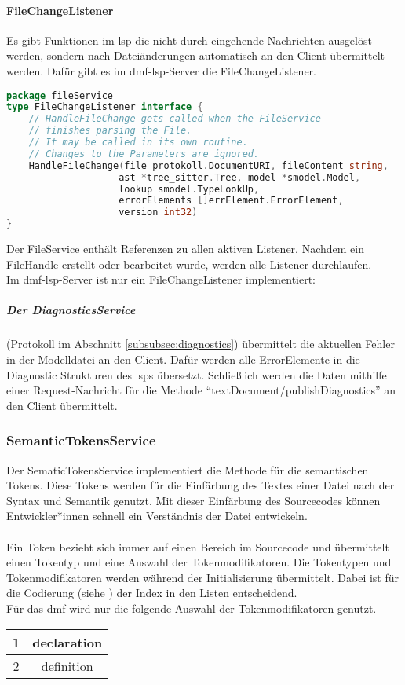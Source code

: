\documentclass[./einleitung.tex]{subfiles}
\begin{document}
    \paragraph{FileChangeListener}
    Es gibt Funktionen im \acrshort{lsp} die nicht durch eingehende Nachrichten ausgelöst werden, sondern nach Dateiänderungen automatisch an den Client übermittelt werden.
    Dafür gibt es im \acrshort{dmf}-\acrshort{lsp}-Server die FileChangeListener.
    \begin{lstlisting}[language=Go]
package fileService
type FileChangeListener interface {
	// HandleFileChange gets called when the FileService
    // finishes parsing the File.
    // It may be called in its own routine.
    // Changes to the Parameters are ignored.
	HandleFileChange(file protokoll.DocumentURI, fileContent string,
                    ast *tree_sitter.Tree, model *smodel.Model,
                    lookup smodel.TypeLookUp,
                    errorElements []errElement.ErrorElement,
                    version int32)
}
    \end{lstlisting}
    Der FileService enthält Referenzen zu allen aktiven Listener.
    Nachdem ein FileHandle erstellt oder bearbeitet wurde, werden alle Listener durchlaufen.\\
    Im \acrshort{dmf}-\acrshort{lsp}-Server ist nur ein FileChangeListener implementiert:
    \subparagraph[DiagnosticsService]{Der DiagnosticsService }\label{subsubsec:diagnostics-service}
    (Protokoll im Abschnitt \ref{subsubsec:diagnostics})
    übermittelt die aktuellen Fehler in der Modelldatei an den Client.
    Dafür werden alle ErrorElemente in die Diagnostic Strukturen des \acrshort{lsp}s übersetzt.
    Schließlich werden die Daten mithilfe einer Request-Nachricht für die Methode ``textDocument/publishDiagnostics'' an den Client übermittelt.

    \subsubsection{SemanticTokensService }\label{subsubsec:semantic-service}
    Der SematicTokensService implementiert die Methode für die semantischen Tokens.
    Diese Tokens werden für die Einfärbung des Textes einer Datei nach der Syntax und Semantik genutzt.
    Mit dieser Einfärbung des Sourcecodes können Entwickler*innen schnell ein Verständnis der Datei entwickeln.
    \\\\
    Ein Token bezieht sich immer auf einen Bereich im Sourcecode und übermittelt einen Tokentyp und eine Auswahl der Tokenmodifikatoren.
    Die Tokentypen und Tokenmodifikatoren werden während der Initialisierung übermittelt.
    Dabei ist für die Codierung (siehe ) der Index in den Listen entscheidend. \\
    Für das \acrshort{dmf} wird nur die folgende Auswahl der Tokenmodifikatoren genutzt.
    \begin{center}
        \begin{tabular}{|c|c|}
            1 & declaration \\
            \hline
            2 & definition
        \end{tabular}
    \end{center}
\end{document}
